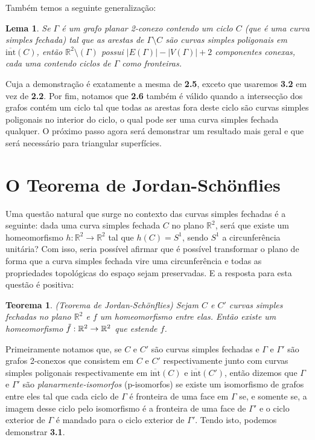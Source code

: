 \documentclass[12pt,a4paper]{article}
\newtheorem{lem}[mydef]{Lema}
\newtheorem{thrm}[mydef]{Teorema}
\theoremstyle{definition}
\begin{document}
Também temos a seguinte generalização: 

\begin{lem}
 
    Se $\Gamma$ é um grafo planar 2-conexo contendo um ciclo $C$ (que é uma curva simples fechada) tal que as arestas de $\Gamma\setminus C$ são curvas simples poligonais em $\overline{\text{int}}(C)$, então $\mathbb{R}^2\setminus(\Gamma)$ possui $|E(\Gamma)|-|V(\Gamma)|+2$ componentes conexas, cada uma contendo ciclos de $\Gamma$ como fronteiras.
    
\end{lem}
 
Cuja a demonstração é exatamente a mesma de \textbf{2.5}, exceto que usaremos \textbf{3.2} em vez de \textbf{2.2}. Por fim, notamos que \textbf{2.6} também é válido quando a intersecção dos grafos contém um ciclo tal que todas as arestas fora deste ciclo são curvas simples poligonais no interior do ciclo, o qual pode ser uma curva simples fechada qualquer. O próximo passo agora será demonstrar um resultado mais geral e que será necessário para triangular superfícies. 

\section{O Teorema de Jordan-Schönflies}

Uma questão natural que surge no contexto das curvas simples fechadas é a seguinte: dada uma curva simples fechada $C$ no plano $\mathbb{R}^2$, será que existe um homeomorfismo $h:\mathbb{R}^2\rightarrow \mathbb{R}^2$ tal que $h(C)=S^1$, sendo $S^1$ a circunferência unitária? Com isso, seria possível afirmar que é possível transformar o plano de forma que a curva simples fechada vire uma circunferência e todas as propriedades topológicas do espaço sejam preservadas. E a resposta para esta questão é positiva:

\begin{thrm}
 
    (Teorema de Jordan-Schönflies) Sejam $C$ e $C'$ curvas simples fechadas no plano $\mathbb{R}^2$ e $f$ um homeomorfismo entre elas. Então existe um homeomorfismo $\Tilde{f}:\mathbb{R}^2\rightarrow \mathbb{R}^2$ que estende $f$.
 
\end{thrm}

Primeiramente notamos que, se $C$ e $C'$ são curvas simples fechadas e $\Gamma$ e $\Gamma'$ são grafos 2-conexos que consistem em $C$ e $C'$ respectivamente junto com curvas simples poligonais respectivamente em $\overline{\text{int}}(C)$ e $\overline{\text{int}}(C')$, então dizemos que $\Gamma$ e $\Gamma'$ são \textit{planarmente-isomorfos} (p-isomorfos) se existe um isomorfismo de grafos entre eles tal que cada ciclo de $\Gamma$ é fronteira de uma face em $\Gamma$ se, e somente se, a imagem desse ciclo pelo isomorfismo é a fronteira de uma face de $\Gamma'$ e o ciclo exterior de $\Gamma$ é mandado para o ciclo exterior de $\Gamma'$. Tendo isto, podemos demonstrar \textbf{3.1}. \\
 
\end{document}
